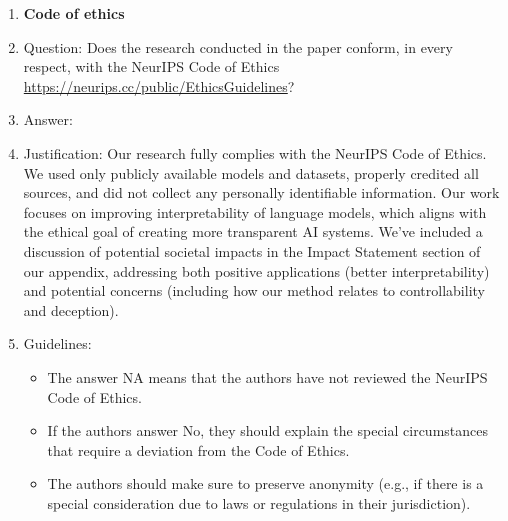 \documentclass{article}
\begin{document}
\begin{enumerate}
\item {\bf Code of ethics}
    \item[] Question: Does the research conducted in the paper conform, in every respect, with the NeurIPS Code of Ethics \url{https://neurips.cc/public/EthicsGuidelines}?
    \item[] Answer: \answerYes{} %
    \item[] Justification: Our research fully complies with the NeurIPS Code of Ethics. We used only publicly available models and datasets, properly credited all sources, and did not collect any personally identifiable information. Our work focuses on improving interpretability of language models, which aligns with the ethical goal of creating more transparent AI systems. We've included a discussion of potential societal impacts in the Impact Statement section of our appendix, addressing both positive applications (better interpretability) and potential concerns (including how our method relates to controllability and deception).
    \item[] Guidelines:
    \begin{itemize}
        \item The answer NA means that the authors have not reviewed the NeurIPS Code of Ethics.
        \item If the authors answer No, they should explain the special circumstances that require a deviation from the Code of Ethics.
        \item The authors should make sure to preserve anonymity (e.g., if there is a special consideration due to laws or regulations in their jurisdiction).
    \end{itemize}



\end{enumerate}
\end{document}
